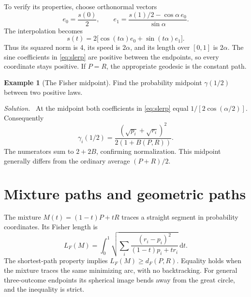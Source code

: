\documentclass[11pt,oneside,openany]{book}
\theoremstyle{definition}
\newtheorem{example}{Example}[chapter]
\theoremstyle{remark}
\newenvironment{solution}{\par\smallskip\noindent\textit{Solution.}\ }{\par\smallskip}
\newcommand{\dd}{\,\mathrm{d}}
\numberwithin{equation}{chapter}
\begin{document}
To verify its properties, choose orthonormal vectors
\[
e_0=\frac{s(0)}2,\qquad
e_1=\frac{s(1)/2-\cos\alpha\,e_0}{\sin\alpha}.
\]
The interpolation becomes
\[
s(t)=2\bigl[\cos(t\alpha)e_0+\sin(t\alpha)e_1\bigr].
\]
Thus its squared norm is 4, its speed is $2\alpha$, and its length over $[0,1]$ is $2\alpha$. The sine coefficients in \eqref{eq:slerp} are positive between the endpoints, so every coordinate stays positive. If $P=R$, the appropriate geodesic is the constant path.

\begin{example}[The Fisher midpoint]
Find the probability midpoint $\gamma(1/2)$ between two positive laws.
\begin{solution}
At the midpoint both coefficients in \eqref{eq:slerp} equal $1/[2\cos(\alpha/2)]$. Consequently
\begin{equation}\label{eq:fishermidpoint}
\gamma_i(1/2)=\frac{(\sqrt{p_i}+\sqrt{r_i})^2}{2(1+B(P,R))}.
\end{equation}
The numerators sum to $2+2B$, confirming normalization. This midpoint generally differs from the ordinary average $(P+R)/2$.
\end{solution}
\end{example}

\section{Mixture paths and geometric paths}
The mixture $M(t)=(1-t)P+tR$ traces a straight segment in probability coordinates. Its Fisher length is
\begin{equation}\label{eq:mixturelength}
L_F(M)=\int_0^1\sqrt{\sum_i\frac{(r_i-p_i)^2}{(1-t)p_i+tr_i}}\dd t.
\end{equation}
The shortest-path property implies $L_F(M)\geq d_F(P,R)$. Equality holds when the mixture traces the same minimizing arc, with no backtracking. For general three-outcome endpoints its spherical image bends away from the great circle, and the inequality is strict.
\end{document}
